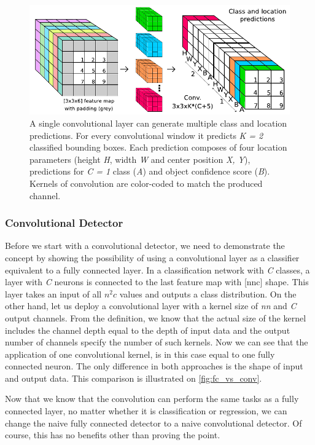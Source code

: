 \begin{figure}
    \centering
    \includegraphics[width=\textwidth]{img/conv_pred}
    \caption[Class and location predictions by convolutional layer]{A single convolutional layer can generate multiple class and location predictions. For every convolutional window it predicts \textit{K = 2} classified bounding boxes. Each prediction composes of four location parameters (height \textit{H}, width \textit{W} and center position \textit{X, Y}), predictions for \textit{C = 1} class  (\textit{A}) and object confidence score (\textit{B}). Kernels of convolution are color-coded to match the produced channel.}
    \label{fig:conv_pred}
\end{figure}

\subsubsection{Convolutional Detector}
Before we start with a convolutional detector, we need to demonstrate the concept by showing the possibility of using a convolutional layer as a classifier equivalent to a fully connected layer. In a classification network with \textit{C} classes, a layer with \textit{C} neurons is connected to the last feature map with [n\x n\x c] shape. This layer takes an input of all $n^2c$ values and outputs a class distribution. On the other hand, let us deploy a convolutional layer with a kernel size of \textit{n\x n} and \textit{C} output channels. From the definition, we know that the actual size of the kernel includes the channel depth equal to the depth of input data and the output number of channels specify the number of such kernels. Now we can see that the application of one convolutional kernel, is in this case equal to one fully connected neuron. The only difference in both approaches is the shape of input and output data. This comparison is illustrated on \cref{fig:fc_vs_conv}.

Now that we know that the convolution can perform the same tasks as a fully connected layer, no matter whether it is classification or regression, we can change the naive fully connected detector to a naive convolutional detector. Of course, this has no benefits other than proving the point.

